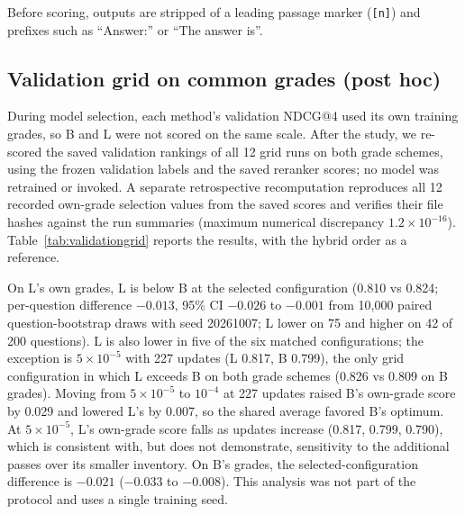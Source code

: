 Before scoring, outputs are stripped of a leading passage marker (\texttt{[n]}) and prefixes such as ``Answer:'' or ``The answer is''.

\subsection{Validation grid on common grades (post hoc)}\label{sec:validationgrid}
During model selection, each method's validation NDCG@4 used its own training grades, so B and L were not scored on the same scale. After the study, we re-scored the saved validation rankings of all 12 grid runs on both grade schemes, using the frozen validation labels and the saved reranker scores; no model was retrained or invoked. A separate retrospective recomputation reproduces all 12 recorded own-grade selection values from the saved scores and verifies their file hashes against the run summaries (maximum numerical discrepancy $1.2\times10^{-16}$). Table~\ref{tab:validationgrid} reports the results, with the hybrid order as a reference.

On L's own grades, L is below B at the selected configuration (0.810 vs 0.824; per-question difference $-0.013$, 95\% CI $-0.026$ to $-0.001$ from 10,000 paired question-bootstrap draws with seed 20261007; L lower on 75 and higher on 42 of 200 questions). L is also lower in five of the six matched configurations; the exception is $5\times10^{-5}$ with 227 updates (L 0.817, B 0.799), the only grid configuration in which L exceeds B on both grade schemes (0.826 vs 0.809 on B grades). Moving from $5\times10^{-5}$ to $10^{-4}$ at 227 updates raised B's own-grade score by 0.029 and lowered L's by 0.007, so the shared average favored B's optimum. At $5\times10^{-5}$, L's own-grade score falls as updates increase (0.817, 0.799, 0.790), which is consistent with, but does not demonstrate, sensitivity to the additional passes over its smaller inventory. On B's grades, the selected-configuration difference is $-0.021$ ($-0.033$ to $-0.008$). This analysis was not part of the protocol and uses a single training seed.
\FloatBarrier

